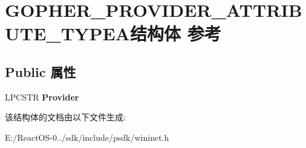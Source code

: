 \hypertarget{struct_g_o_p_h_e_r___p_r_o_v_i_d_e_r___a_t_t_r_i_b_u_t_e___t_y_p_e_a}{}\section{G\+O\+P\+H\+E\+R\+\_\+\+P\+R\+O\+V\+I\+D\+E\+R\+\_\+\+A\+T\+T\+R\+I\+B\+U\+T\+E\+\_\+\+T\+Y\+P\+E\+A结构体 参考}
\label{struct_g_o_p_h_e_r___p_r_o_v_i_d_e_r___a_t_t_r_i_b_u_t_e___t_y_p_e_a}
\subsection*{Public 属性}
\begin{DoxyCompactItemize}
\item 
\mbox{\label{struct_g_o_p_h_e_r___p_r_o_v_i_d_e_r___a_t_t_r_i_b_u_t_e___t_y_p_e_a_a3650e53b30c791299d00e5533fd367d2}} 
L\+P\+C\+S\+TR {\bfseries Provider}
\end{DoxyCompactItemize}


该结构体的文档由以下文件生成\+:\begin{DoxyCompactItemize}
\item 
E\+:/\+React\+O\+S-\/0../sdk/include/psdk/wininet.\+h\end{DoxyCompactItemize}
